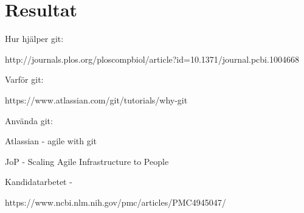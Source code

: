 \section{Resultat}
\label{sec:bjorn-results}

Hur hjälper git:

http://journals.plos.org/ploscompbiol/article?id=10.1371/journal.pcbi.1004668

Varför git:

https://www.atlassian.com/git/tutorials/why-git

Använda git:

Atlassian - agile with git

JoP - Scaling Agile Infrastructure to People

Kandidatarbetet - 

https://www.ncbi.nlm.nih.gov/pmc/articles/PMC4945047/